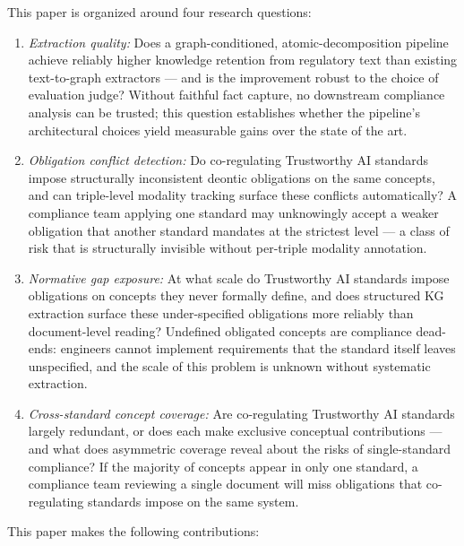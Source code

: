 \medskip
\noindent This paper is organized around four research questions:

\begin{enumerate}

    \item[\textbf{RQ1}] \emph{Extraction quality:} Does a graph-conditioned, atomic-decomposition pipeline achieve reliably higher knowledge retention from regulatory text than existing text-to-graph extractors — and is the improvement robust to the choice of evaluation judge? Without faithful fact capture, no downstream compliance analysis can be trusted; this question establishes whether the pipeline's architectural choices yield measurable gains over the state of the art.

    \item[\textbf{RQ2}] \emph{Obligation conflict detection:} Do co-regulating Trustworthy AI standards impose structurally inconsistent deontic obligations on the same concepts, and can triple-level modality tracking surface these conflicts automatically? A compliance team applying one standard may unknowingly accept a weaker obligation that another standard mandates at the strictest level — a class of risk that is structurally invisible without per-triple modality annotation.

    \item[\textbf{RQ3}] \emph{Normative gap exposure:} At what scale do Trustworthy AI standards impose obligations on concepts they never formally define, and does structured KG extraction surface these under-specified obligations more reliably than document-level reading? Undefined obligated concepts are compliance dead-ends: engineers cannot implement requirements that the standard itself leaves unspecified, and the scale of this problem is unknown without systematic extraction.

    \item[\textbf{RQ4}] \emph{Cross-standard concept coverage:} Are co-regulating Trustworthy AI standards largely redundant, or does each make exclusive conceptual contributions — and what does asymmetric coverage reveal about the risks of single-standard compliance? If the majority of concepts appear in only one standard, a compliance team reviewing a single document will miss obligations that co-regulating standards impose on the same system.

\end{enumerate}

\medskip
\noindent This paper makes the following contributions:

